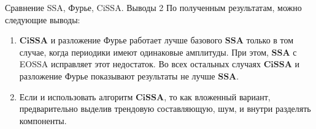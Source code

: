 \documentclass[notheorems, handout]{beamer}
\newcommand{\SSA}{\textbf{SSA}}
\newcommand{\CISSA}{\textbf{CiSSA}}
\begin{document}
	
	\begin{frame}{Сравнение SSA, Фурье, CiSSA. Выводы 2}
		По полученным результатам, можно следующие выводы: 
		\begin{enumerate}
			\item $\CISSA$ и разложение Фурье работает лучше базового $\SSA$ только в том случае, когда периодики имеют одинаковые амплитуды. При этом, $\SSA$ с EOSSA исправляет этот недостаток. Во всех остальных случаях $\CISSA$ и разложение Фурье показывают результаты не лучше $\SSA$. 
			\item Если и использовать алгоритм $\CISSA$, то как вложенный вариант, предварительно выделив трендовую составляющую, шум, и внутри разделять компоненты.
		\end{enumerate}

	\end{frame}
	
	
	
	
	
\end{document}
